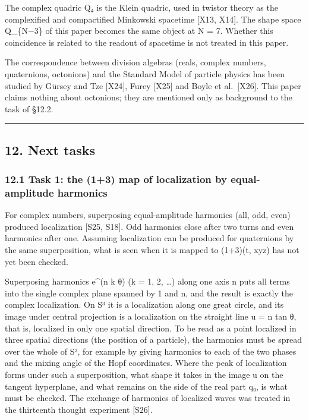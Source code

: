 \documentclass[
  a4paper,
]{article}
\begin{document}
The complex quadric Q₄ is the Klein quadric, used in twistor theory as
the complexified and compactified Minkowski spacetime {[}X13, X14{]}.
The shape space Q\_\{N−3\} of this paper becomes the same object at N =
7. Whether this coincidence is related to the readout of spacetime is
not treated in this paper.

The correspondence between division algebras (reals, complex numbers,
quaternions, octonions) and the Standard Model of particle physics has
been studied by Gürsey and Tze {[}X24{]}, Furey {[}X25{]} and Boyle et
al.~{[}X26{]}. This paper claims nothing about octonions; they are
mentioned only as background to the task of §12.2.

\begin{center}\rule{0.5\linewidth}{0.5pt}\end{center}

\subsection{12. Next tasks}\label{next-tasks}

\subsubsection{12.1 Task 1: the (1+3) map of localization by
equal-amplitude
harmonics}\label{task-1-the-13-map-of-localization-by-equal-amplitude-harmonics}

For complex numbers, superposing equal-amplitude harmonics (all, odd,
even) produced localization {[}S25, S18{]}. Odd harmonics close after
two turns and even harmonics after one. Assuming localization can be
produced for quaternions by the same superposition, what is seen when it
is mapped to (1+3)(t, xyz) has not yet been checked.

Superposing harmonics e\^{}(n k θ) (k = 1, 2, \ldots) along one axis n
puts all terms into the single complex plane spanned by 1 and n, and the
result is exactly the complex localization. On S³ it is a localization
along one great circle, and its image under central projection is a
localization on the straight line u = n tan θ, that is, localized in
only one spatial direction. To be read as a point localized in three
spatial directions (the position of a particle), the harmonics must be
spread over the whole of S³, for example by giving harmonics to each of
the two phases and the mixing angle of the Hopf coordinates. Where the
peak of localization forms under such a superposition, what shape it
takes in the image u on the tangent hyperplane, and what remains on the
side of the real part q₀, is what must be checked. The exchange of
harmonics of localized waves was treated in the thirteenth thought
experiment {[}S26{]}.
\end{document}
